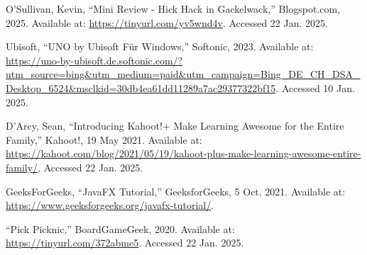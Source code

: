 \documentclass[conference]{IEEEtran}
\begin{document}
\begin{thebibliography}{00}
 O’Sullivan, Kevin, “Mini Review - Hick Hack in Gackelwack,” Blogspot.com, 2025. Available at: \url{https://tinyurl.com/yv5wnd4v}. Accessed 22 Jan. 2025.
\vspace{1em}

 Ubisoft, “UNO by Ubisoft Für Windows,” Softonic, 2023. Available at: \url{https://uno-by-ubisoft.de.softonic.com/?utm_source=bing&utm_medium=paid&utm_campaign=Bing_DE_CH_DSA_Desktop_6524&msclkid=30db4ea61dd11289a7ac29377322bf15}. Accessed 10 Jan. 2025.
\vspace{1em}

 D’Arcy, Sean, “Introducing Kahoot!+ Make Learning Awesome for the Entire Family,” Kahoot!, 19 May 2021. Available at: \url{https://kahoot.com/blog/2021/05/19/kahoot-plus-make-learning-awesome-entire-family/}. Accessed 22 Jan. 2025.
\vspace{1em}

 GeeksForGeeks, “JavaFX Tutorial,” GeeksforGeeks, 5 Oct. 2021. Available at: \url{https://www.geeksforgeeks.org/javafx-tutorial/}.
\vspace{1em}

 “Pick Picknic,” BoardGameGeek, 2020. Available at: \url{https://tinyurl.com/372abme5}. Accessed 22 Jan. 2025.



\end{thebibliography}
\end{document}
